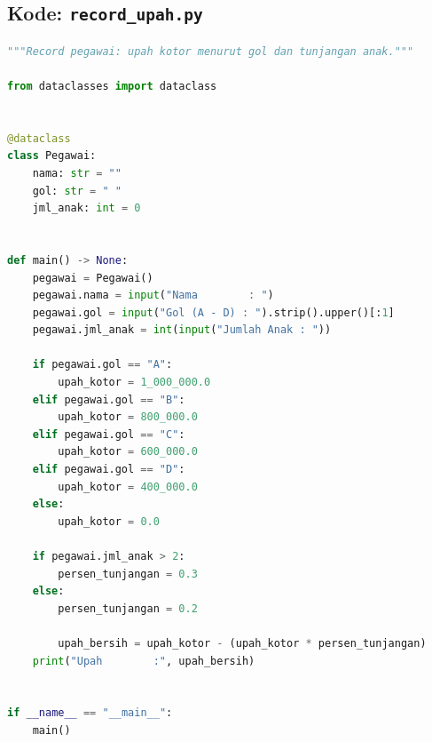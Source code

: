 \documentclass[../main.tex]{subfiles}
\begin{document}
\subsection{Kode: \texttt{record\_upah.py}}
\begin{lstlisting}[language=Python,caption={\texttt{record\_upah.py}}]
"""Record pegawai: upah kotor menurut gol dan tunjangan anak."""

from dataclasses import dataclass


@dataclass
class Pegawai:
    nama: str = ""
    gol: str = " "
    jml_anak: int = 0


def main() -> None:
    pegawai = Pegawai()
    pegawai.nama = input("Nama        : ")
    pegawai.gol = input("Gol (A - D) : ").strip().upper()[:1]
    pegawai.jml_anak = int(input("Jumlah Anak : "))

    if pegawai.gol == "A":
        upah_kotor = 1_000_000.0
    elif pegawai.gol == "B":
        upah_kotor = 800_000.0
    elif pegawai.gol == "C":
        upah_kotor = 600_000.0
    elif pegawai.gol == "D":
        upah_kotor = 400_000.0
    else:
        upah_kotor = 0.0

    if pegawai.jml_anak > 2:
        persen_tunjangan = 0.3
    else:
        persen_tunjangan = 0.2

        upah_bersih = upah_kotor - (upah_kotor * persen_tunjangan)
    print("Upah        :", upah_bersih)


if __name__ == "__main__":
    main()
\end{lstlisting}
\end{document}
